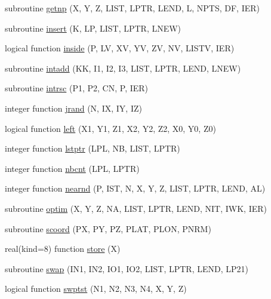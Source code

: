 \begin{DoxyCompactItemize}
\item 
subroutine \hyperlink{stripack_8f_aacd9d568b3d944faa7a8984ef3dff236}{getnp} (X, Y, Z, L\+I\+S\+T, L\+P\+T\+R, L\+E\+N\+D, L, N\+P\+T\+S, D\+F, I\+E\+R)
\item 
subroutine \hyperlink{stripack_8f_a230a1fd1fd5a8d7f74fa6debf1ecab4a}{insert} (K, L\+P, L\+I\+S\+T, L\+P\+T\+R, L\+N\+E\+W)
\item 
logical function \hyperlink{stripack_8f_a725cce083be90d983fdee018486ad512}{inside} (P, L\+V, X\+V, Y\+V, Z\+V, N\+V, L\+I\+S\+T\+V, I\+E\+R)
\item 
subroutine \hyperlink{stripack_8f_aee4a57d9a90fd0daab3dbb88afe5c7fc}{intadd} (K\+K, I1, I2, I3, L\+I\+S\+T, L\+P\+T\+R, L\+E\+N\+D, L\+N\+E\+W)
\item 
subroutine \hyperlink{stripack_8f_a8c09fd901b29fa48172c58aae9a7a306}{intrsc} (P1, P2, C\+N, P, I\+E\+R)
\item 
integer function \hyperlink{stripack_8f_aac9c0b11b84daa31f97a1b25659e3f26}{jrand} (N, I\+X, I\+Y, I\+Z)
\item 
logical function \hyperlink{stripack_8f_aa62f0f16f1f1c00daf8edf8568426b5d}{left} (X1, Y1, Z1, X2, Y2, Z2, X0, Y0, Z0)
\item 
integer function \hyperlink{stripack_8f_af20d3c39d61b9a12b2e9058d44a48ea9}{lstptr} (L\+P\+L, N\+B, L\+I\+S\+T, L\+P\+T\+R)
\item 
integer function \hyperlink{stripack_8f_ac6462118b76690f96b213cdd9c4c35bd}{nbcnt} (L\+P\+L, L\+P\+T\+R)
\item 
integer function \hyperlink{stripack_8f_a71c559853737cc7edb49f7ccf4ae39f3}{nearnd} (P, I\+S\+T, N, X, Y, Z, L\+I\+S\+T, L\+P\+T\+R, L\+E\+N\+D, A\+L)
\item 
subroutine \hyperlink{stripack_8f_a28925529c560aedb239ff8fbc92aae6e}{optim} (X, Y, Z, N\+A, L\+I\+S\+T, L\+P\+T\+R, L\+E\+N\+D, N\+I\+T, I\+W\+K, I\+E\+R)
\item 
subroutine \hyperlink{stripack_8f_a91e4b86af319d02b2e107e0924721ffe}{scoord} (P\+X, P\+Y, P\+Z, P\+L\+A\+T, P\+L\+O\+N, P\+N\+R\+M)
\item 
real(kind=8) function \hyperlink{stripack_8f_a64b8e3b418c1277fd84265174362f292}{store} (X)
\item 
subroutine \hyperlink{stripack_8f_ad2521b0b4f89e87a232e4d9b4b103c57}{swap} (I\+N1, I\+N2, I\+O1, I\+O2, L\+I\+S\+T, L\+P\+T\+R, L\+E\+N\+D, L\+P21)
\item 
logical function \hyperlink{stripack_8f_a0fecdb27ac582e887146b1f10fb57644}{swptst} (N1, N2, N3, N4, X, Y, Z)

\end{DoxyCompactItemize}
